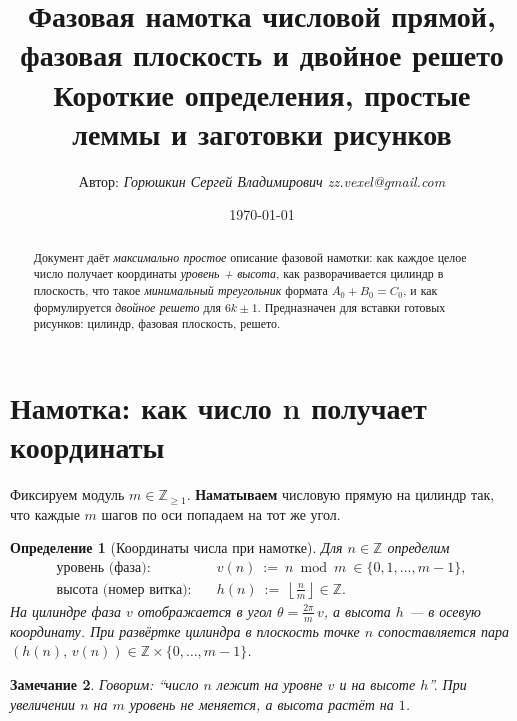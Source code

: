 \documentclass[11pt,a4paper]{article}
\title{\textbf{Фазовая намотка числовой прямой, фазовая плоскость и двойное решето}\\
\large Короткие определения, простые леммы и заготовки рисунков}
\author{Автор: \textit{Горюшкин Сергей Владимирович zz.vexel@gmail.com}}
\date{\today}
\newtheorem{definition}{Определение}[section]
\newtheorem{remark}[definition]{Замечание}
\newcommand{\Z}{\mathbb{Z}}
\begin{document}
\maketitle

\begin{abstract}
Документ даёт \emph{максимально простое} описание фазовой намотки: как каждое целое число получает координаты \emph{уровень + высота}, как разворачивается цилиндр в плоскость, что такое \emph{минимальный треугольник} формата $A_0+B_0=C_0$, и как формулируется \emph{двойное решето} для $6k\pm1$. Предназначен для вставки готовых рисунков: цилиндр, фазовая плоскость, решето.
\end{abstract}

\tableofcontents

\section{Намотка: как число n получает координаты}\label{sec:coords}
Фиксируем модуль $m\in\Z_{\ge1}$. \textbf{Наматываем} числовую прямую на цилиндр так, что каждые $m$ шагов по оси попадаем на тот же угол.

\begin{definition}[Координаты числа при намотке]\label{def:coords}
Для $n\in\Z$ определим
\begin{align*}
\text{уровень (фаза):}\quad & v(n)\ :=\ n \bmod m\ \in \{0,1,\dots,m-1\},\\
\text{высота (номер витка):}\quad & h(n)\ :=\ \left\lfloor \frac{n}{m}\right\rfloor \in \Z.
\end{align*}
На цилиндре фаза $v$ отображается в угол $\theta=\frac{2\pi}{m}\,v$, а высота $h$ --- в осевую координату. При \emph{развёртке} цилиндра в плоскость точке $n$ сопоставляется пара $(h(n),\,v(n))\in\Z\times\{0,\dots,m-1\}$.
\end{definition}

\begin{remark}
Говорим: \emph{``число $n$ лежит на уровне $v$ и на высоте $h$''}. При увеличении $n$ на $m$ уровень не меняется, а высота растёт на $1$.
\end{remark}
\end{document}
